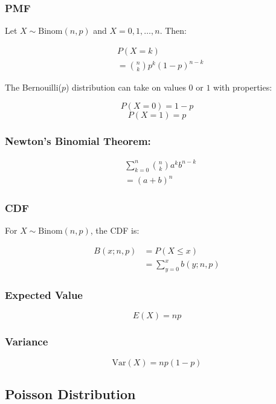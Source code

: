 \subsubsection{PMF}

Let $X \sim \text{Binom}(n,p)$ and $X = 0,1,\dots,n$. Then:

\begin{align*}
     & P(X = k)                       \\
     & = \binom{n}{k} p^k (1-p)^{n-k}
\end{align*}

The Bernouilli($p$) distribution can take on values $0$ or $1$ with properties:

$$ P(X = 0) = 1 - p $$
$$ P(X = 1) = p $$

\subsubsection{Newton's Binomial Theorem:}

\begin{align*}
     & \sum_{k=0}^n \binom{n}{k} a^k b^{n-k} \\
     & =(a + b)^n
\end{align*}

\subsubsection{CDF}

For $X\sim \text{Binom}(n,p)$, the CDF is:

\begin{align*}
    B(x;n,p) & = P(X \leq x)           \\
             & = \sum_{y=0}^x b(y;n,p)
\end{align*}

\subsubsection{Expected Value}

$$ E(X) = np $$

\subsubsection{Variance}

$$ \text{Var}(X) = np(1-p) $$

\subsection{Poisson Distribution}

